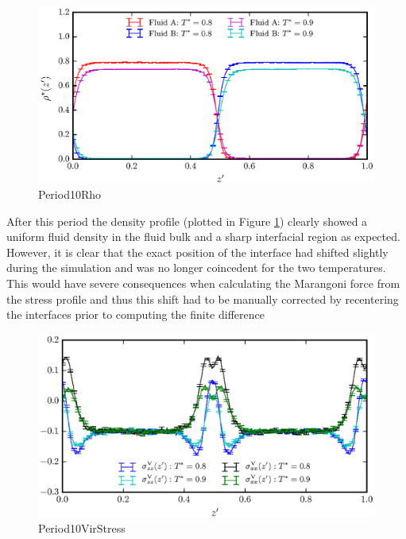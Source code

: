 \begin{figure}[h]
\includegraphics[scale=0.8]{Period10Rho}
\caption{Period10Rho}
\label{Period10Rho}
\end{figure}
After this period the density profile (plotted in Figure \ref{Period10Rho}) clearly showed a uniform fluid density in the fluid bulk and a sharp interfacial region as expected.
However, it is clear that the exact position of the interface had shifted slightly during the simulation and was no longer coincedent for the two temperatures.
This would have severe consequences when calculating the Marangoni force from the stress profile and thus this shift had to be manually corrected by recentering the interfaces prior to computing the finite difference
\FloatBarrier

\begin{figure}[h]
\includegraphics[scale=0.8]{Period10VirStress}
\caption{Period10VirStress}
\label{Period10VirStress}
\end{figure}

